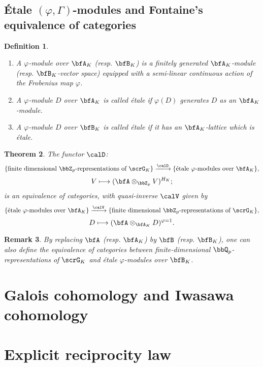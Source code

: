 \documentclass[a4paper,oneside]{amsart}
\newtheorem{theorem}{Theorem}[subsection]
\newtheorem{remark}[theorem]{Remark}
\newtheorem{definition}[theorem]{Definition}
\numberwithin{equation}{section}
\numberwithin{figure}{section}
\begin{document}
\subsection{\'Etale $(\varphi,\Gamma)$-modules and Fontaine's equivalence of categories}
\begin{definition}
	\begin{enumerate}
		\item A $\varphi$-module over $\bfA_K$ (resp. $\bfB_K$) is a finitely generated $\bfA_K$-module (resp. $\bfB_K$-vector space) equipped with a semi-linear continuous action of the Frobenius map $\varphi$.
		\item A $\varphi$-module $D$ over $\bfA_K$ is called \'etale if $\varphi(D)$ generates $D$ as an $\bfA_K$-module.
		\item A $\varphi$-module $D$ over $\bfB_K$ is called \'etale if it has an $\bfA_K$-lattice which is \'etale.
	\end{enumerate}
\end{definition}
\begin{theorem}
	The functor $\calD$:
	$$\{\text{finite dimensional }\bbZ_p\text{-representations of }\scrG_K\}\xlto{\calD} \{\text{\'etale } \varphi\text{-modules over }\bfA_K\},$$
	$$V\longmapsto (\bfA\otimes_{\bbZ_p} V)^{H_K};$$
	is an equivalence of categories, with quasi-inverse $\calV$ given by
	$$\{\text{\'etale } \varphi\text{-modules over }\bfA_K\}\xlto{\calV} \{\text{finite dimensional }\bbZ_p\text{-representations of }\scrG_K\},$$
	$$D\longmapsto (\bfA\otimes_{\bfA_K} D)^{\varphi=1}.$$
\end{theorem}
\begin{remark}
	By replacing $\bfA$ (resp. $\bfA_K$) by $\bfB$ (resp. $\bfB_K$), one can also define the equivalence of categories between finite-dimensional $\bbQ_p$-representations of $\scrG_K$ and \'etale $\varphi$-modules over $\bfB_K$.
\end{remark}
\section{Galois cohomology and Iwasawa cohomology}
\section{Explicit reciprocity law}
\end{document}
